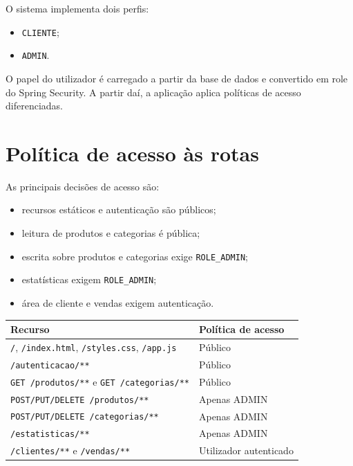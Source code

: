 \documentclass[10pt,a4paper]{report}
\begin{document}
O sistema implementa dois perfis:

\begin{itemize}
    \item \texttt{CLIENTE};
    \item \texttt{ADMIN}.
\end{itemize}

O papel do utilizador é carregado a partir da base de dados e convertido em role do Spring Security. A partir daí, a aplicação aplica políticas de acesso diferenciadas.

\section{Política de acesso às rotas}

As principais decisões de acesso são:

\begin{itemize}
    \item recursos estáticos e autenticação são públicos;
    \item leitura de produtos e categorias é pública;
    \item escrita sobre produtos e categorias exige \texttt{ROLE\_ADMIN};
    \item estatísticas exigem \texttt{ROLE\_ADMIN};
    \item área de cliente e vendas exigem autenticação.
\end{itemize}

\begin{center}
\begin{tabular}{|>{\raggedright\arraybackslash}p{7cm}|>{\raggedright\arraybackslash}p{5cm}|}
\hline
\textbf{Recurso} & \textbf{Política de acesso} \\
\hline
\texttt{/}, \texttt{/index.html}, \texttt{/styles.css}, \texttt{/app.js} & Público \\
\hline
\texttt{/autenticacao/**} & Público \\
\hline
\texttt{GET /produtos/**} e \texttt{GET /categorias/**} & Público \\
\hline
\texttt{POST/PUT/DELETE /produtos/**} & Apenas ADMIN \\
\hline
\texttt{POST/PUT/DELETE /categorias/**} & Apenas ADMIN \\
\hline
\texttt{/estatisticas/**} & Apenas ADMIN \\
\hline
\texttt{/clientes/**} e \texttt{/vendas/**} & Utilizador autenticado \\
\hline
\end{tabular}
\end{center}
\end{document}
